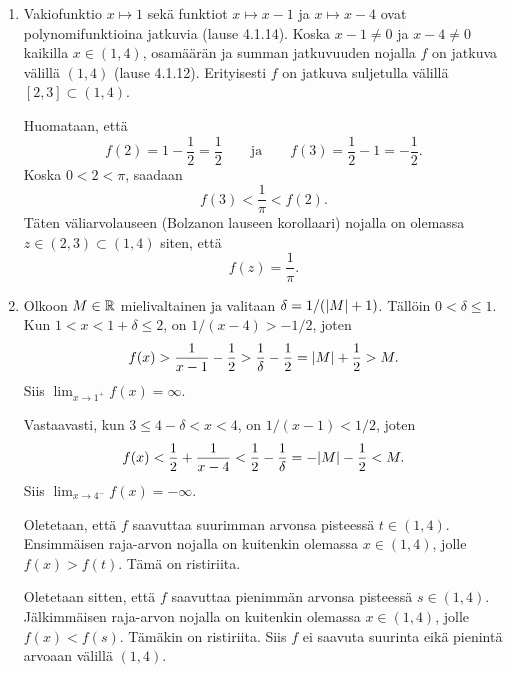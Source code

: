 \documentclass[11pt,a4paper]{amsart}
\begin{document}
\begin{solution}
  \leavevmode\par
  \begin{enumerate}[label=(\alph*), nosep]
    \item Vakiofunktio \(x \mapsto 1\) sekä funktiot \(x \mapsto x-1\)
      ja \(x \mapsto x-4\) ovat polynomifunktioina jatkuvia (lause 4.1.14).
      Koska \(x-1 \neq 0\) ja \(x-4 \neq 0\) kaikilla \(x \in (1, 4)\),
      osamäärän ja summan jatkuvuuden nojalla \(f\) on jatkuva välillä
      \((1, 4)\) (lause 4.1.12). Erityisesti \(f\) on jatkuva suljetulla
      välillä \([2, 3] \subset (1, 4)\).

      Huomataan, että
      \[
        f(2) = 1 - \frac{1}{2} = \frac{1}{2}
        \qquad\text{ja}\qquad
        f(3) = \frac{1}{2} - 1 = -\frac{1}{2}.
      \]
      Koska \(0 < 2 < \pi\), saadaan
      \[
        f(3) < \frac{1}{\pi} < f(2).
      \]
      Täten väliarvolauseen (Bolzanon lauseen korollaari) nojalla
      on olemassa \(z \in (2, 3) \subset (1, 4)\) siten, että
      \[
        f(z) = \frac{1}{\pi}.
      \]
    \item Olkoon \(M \in \mathbb{R}\) mielivaltainen ja valitaan
      \(\delta = 1/(\lvert M\rvert+1)\). Tällöin \(0 < \delta \leq 1\).
      Kun \(1 < x < 1+\delta \leq 2\), on \(1/(x-4) > -1/2\), joten
      \[
        f(x) > \frac{1}{x-1} - \frac12
        > \frac{1}{\delta} - \frac12
        = \lvert M\rvert + \frac12 > M.
      \]
      Siis \(\lim_{x \to 1^+} f(x) = \infty\).

      Vastaavasti, kun \(3 \leq 4-\delta < x < 4\), on
      \(1/(x-1) < 1/2\), joten
      \[
        f(x) < \frac12 + \frac{1}{x-4}
        < \frac12 - \frac{1}{\delta}
        = -\lvert M\rvert - \frac12 < M.
      \]
      Siis \(\lim_{x \to 4^-} f(x) = -\infty\).

      Oletetaan, että \(f\) saavuttaa suurimman arvonsa pisteessä
      \(t \in (1, 4)\). Ensimmäisen raja-arvon nojalla on kuitenkin olemassa
      \(x \in (1, 4)\), jolle \(f(x) > f(t)\). Tämä on ristiriita.

      Oletetaan sitten, että \(f\) saavuttaa pienimmän arvonsa pisteessä
      \(s \in (1, 4)\). Jälkimmäisen raja-arvon nojalla on kuitenkin olemassa
      \(x \in (1, 4)\), jolle \(f(x) < f(s)\).
      Tämäkin on ristiriita. Siis \(f\) ei saavuta suurinta eikä pienintä
      arvoaan välillä \((1, 4)\).
  \end{enumerate}
\end{solution}
\end{document}
